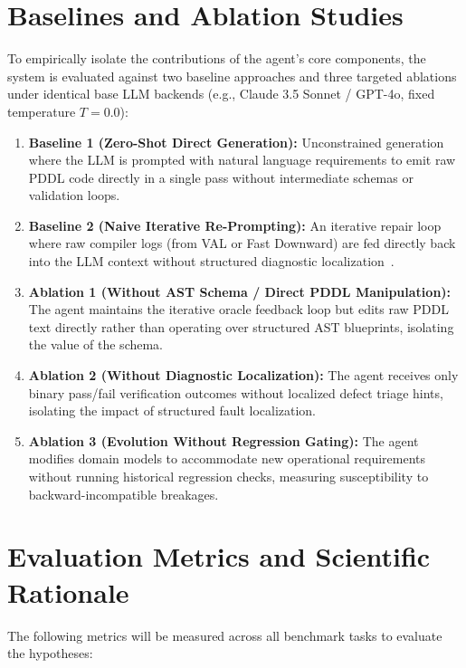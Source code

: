\documentclass[10pt,a4paper]{article}
\begin{document}
\section{Baselines and Ablation Studies}
To empirically isolate the contributions of the agent's core components, the system is evaluated against two baseline approaches and three targeted ablations under identical base LLM backends (e.g., Claude 3.5 Sonnet / GPT-4o, fixed temperature $T=0.0$):
\begin{enumerate}[leftmargin=1.4em]
    \item \textbf{Baseline 1 (Zero-Shot Direct Generation):} Unconstrained generation where the LLM is prompted with natural language requirements to emit raw PDDL code directly in a single pass without intermediate schemas or validation loops.
    \item \textbf{Baseline 2 (Naive Iterative Re-Prompting):} An iterative repair loop where raw compiler logs (from VAL or Fast Downward) are fed directly back into the LLM context without structured diagnostic localization~\cite{bavandpour2026llmonly}.
    \item \textbf{Ablation 1 (Without AST Schema / Direct PDDL Manipulation):} The agent maintains the iterative oracle feedback loop but edits raw PDDL text directly rather than operating over structured AST blueprints, isolating the value of the schema.
    \item \textbf{Ablation 2 (Without Diagnostic Localization):} The agent receives only binary pass/fail verification outcomes without localized defect triage hints, isolating the impact of structured fault localization.
    \item \textbf{Ablation 3 (Evolution Without Regression Gating):} The agent modifies domain models to accommodate new operational requirements without running historical regression checks, measuring susceptibility to backward-incompatible breakages.
\end{enumerate}

\section{Evaluation Metrics and Scientific Rationale}
The following metrics will be measured across all benchmark tasks to evaluate the hypotheses:
\end{document}
